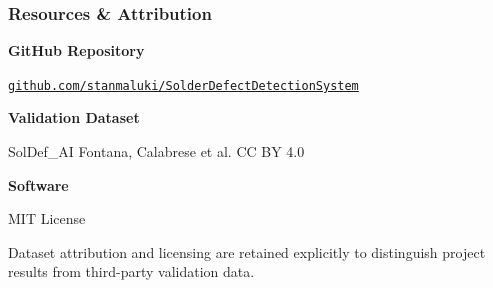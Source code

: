 \documentclass[aspectratio=169,11pt]{beamer}
\newcommand{\emphred}[1]{\textcolor{secondary}{#1}}
\begin{document}
\begin{frame}\frametitle{\emphred{Resources \& Attribution}}

\begin{center}

\large
\textbf{\emphred{GitHub Repository}}

\vspace{0.2cm}

\href{https://github.com/stanmaluki/SolderDefectDetectionSystem}{
\texttt{github.com/stanmaluki/SolderDefectDetectionSystem}
}

\vspace{0.4cm}

\textbf{\emphred{Validation Dataset}}

\vspace{0.15cm}

SolDef\_AI \quad Fontana, Calabrese et al. \quad CC BY 4.0

\vspace{0.4cm}

\textbf{\emphred{Software}}

\vspace{0.15cm}

MIT License

\vspace{0.35cm}

{\footnotesize
Dataset attribution and licensing are retained explicitly
to distinguish project results from third-party validation data.
}

\end{center}

\end{frame}


\end{document}
